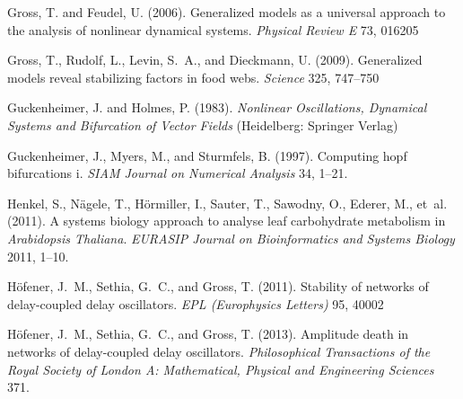 \documentclass{article}
\begin{document}
\begin{thebibliography}{85}
Gross, T. and Feudel, U. (2006).
\newblock Generalized models as a universal approach to the analysis of
  nonlinear dynamical systems.
\newblock \emph{Physical Review E} 73, 016205

Gross, T., Rudolf, L., Levin, S.~A., and Dieckmann, U. (2009).
\newblock Generalized models reveal stabilizing factors in food webs.
\newblock \emph{Science} 325, 747--750

Guckenheimer, J. and Holmes, P. (1983).
\newblock \emph{Nonlinear Oscillations, Dynamical Systems and Bifurcation of
  Vector Fields} (Heidelberg: Springer Verlag)

Guckenheimer, J., Myers, M., and Sturmfels, B. (1997).
\newblock Computing hopf bifurcations i.
\newblock \emph{SIAM Journal on Numerical Analysis} 34, 1--21.
\newblock {}

Henkel, S., N{\"a}gele, T., H{\"o}rmiller, I., Sauter, T., Sawodny, O., Ederer,
  M., et~al. (2011).
\newblock A systems biology approach to analyse leaf carbohydrate metabolism in
  \textit{Arabidopsis Thaliana}.
\newblock \emph{EURASIP Journal on Bioinformatics and Systems Biology} 2011,
  1--10.
\newblock {}

H\"ofener, J.~M., Sethia, G.~C., and Gross, T. (2011).
\newblock Stability of networks of delay-coupled delay oscillators.
\newblock \emph{EPL (Europhysics Letters)} 95, 40002

H\"ofener, J.~M., Sethia, G.~C., and Gross, T. (2013).
\newblock Amplitude death in networks of delay-coupled delay oscillators.
\newblock \emph{Philosophical Transactions of the Royal Society of London A:
  Mathematical, Physical and Engineering Sciences} 371.
\newblock {}


\end{thebibliography}
\end{document}
